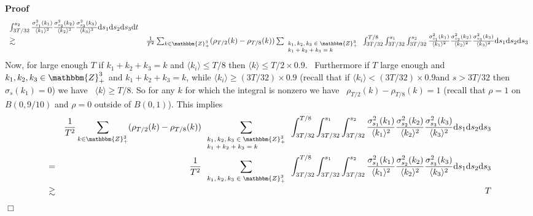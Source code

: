 \documentclass[11pt]{article}
\newcommand{\mathd}{\mathrm{d}}
\newcommand{\tmscript}[1]{\text{\scriptsize{$#1$}}}
\newenvironment{proof}{\noindent\textbf{Proof\ }}{\hspace*{\fill}$\Box$\medskip}
\begin{document}
\begin{proof}
{\[\begin{array}{ll}
       \int^{s_2}_{3 T / 32} \frac{\sigma^2_{s_1} (k_1)}{\langle k_1
       \rangle^2} \frac{\sigma^2_{s_2} (k_2)}{\langle k_2 \rangle^2}
       \frac{\sigma^2_{s_3} (k_3)}{\langle k_3 \rangle^2} \mathd s_1 \mathd
       s_2 \mathd s_3 \mathd t\\
       \gtrsim & \frac{1}{T^2} \sum_{k \in \mathbbm{Z}_+^3} (\rho_{T / 2} (k)
       - \rho_{T / 8} (k)) \sum_{\tmscript{\begin{array}{l}
         k_1, k_2, k_3 \in \mathbbm{Z}_+^3\\
         k_1 + k_2 + k_3 = k
       \end{array}}} \int^{T / 8}_{3 T / 32} \int^{s_1}_{3 T / 32}
       \int^{s_2}_{3 T / 32} \frac{\sigma^2_{s_1} (k_1)}{\langle k_1
       \rangle^2} \frac{\sigma^2_{s_2} (k_2)}{\langle k_2 \rangle^2}
       \frac{\sigma^2_{s_3} (k_3)}{\langle k_3 \rangle^2} \mathd s_1 \mathd
       s_2 \mathd s_3
     \end{array} \]}
  Now, for large enough $T$ if $k_1 + k_2 + k_3 = k$ and $\langle k_i \rangle
  \leqslant T / 8$ then $\langle k \rangle \leqslant T / 2 \times 0.9$. \
  Furthermore if $T$ large enough and $k_1, k_2, k_3 \in \mathbbm{Z}_+^3$ and
  $k_1 + k_2 + k_3 = k$, while $\langle k_i \rangle \geqslant (3 T / 32)
  \times 0.9$ (recall that if $\langle k_i \rangle < (3 T / 32) \times
  0.9$\quad and $s > 3 T / 32$ then $\sigma_s (k_1) = 0$) we have \ $\langle k
  \rangle \geqslant T / 8$. So for any $k$ for which the integral is nonzero
  we have \ $\rho_{T / 2} (k) - \rho_{T / 8} (k) = 1$ (recall that $\rho = 1$
  on $B (0, 9 / 10)$ and $\rho = 0$ outside of $B (0, 1)$). This implies
  {\footnotesize
  \begin{eqnarray*}
    &  & \frac{1}{T^2} \sum_{k \in \mathbbm{Z}_+^3} (\rho_{T / 2} (k) -
    \rho_{T / 8} (k)) \sum_{\tmscript{\begin{array}{l}
      k_1, k_2, k_3 \in \mathbbm{Z}_+^3\\
      k_1 + k_2 + k_3 = k
    \end{array}}} \int^{T / 8}_{3 T / 32} \int^{s_1}_{3 T / 32} \int^{s_2}_{3
    T / 32} \frac{\sigma^2_{s_1} (k_1)}{\langle k_1 \rangle^2}
    \frac{\sigma^2_{s_2} (k_2)}{\langle k_2 \rangle^2} \frac{\sigma^2_{s_3}
    (k_3)}{\langle k_3 \rangle^2} \mathd s_1 \mathd s_2 \mathd s_3\\
    & = & \frac{1}{T^2} \sum_{\tmscript{\begin{array}{l}
      k_1, k_2, k_3 \in \mathbbm{Z}_+^3
    \end{array}}} \int^{T / 8}_{3 T / 32} \int^{s_1}_{3 T / 32} \int^{s_2}_{3
    T / 32} \frac{\sigma^2_{s_1} (k_1)}{\langle k_1 \rangle^2}
    \frac{\sigma^2_{s_2} (k_2)}{\langle k_2 \rangle^2} \frac{\sigma^2_{s_3}
    (k_3)}{\langle k_3 \rangle^2} \mathd s_1 \mathd s_2 \mathd s_3\\
    & \gtrsim & T
  \end{eqnarray*}}
  \end{proof}
\end{document}
